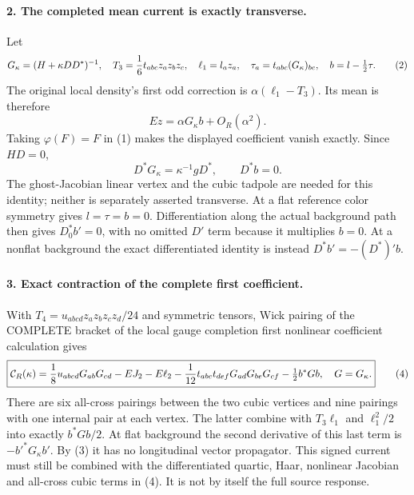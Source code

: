 \documentclass[11pt]{article}
\begin{document}
\paragraph{2. The completed mean current is exactly transverse.}
Let
\[
 G_\kappa=(H+\kappa DD^*)^{-1},\quad
 T_3={1\over6}t_{abc}z_a z_b z_c,\quad
 \ell_1=l_a z_a,\quad
 \tau_a=t_{abc}(G_\kappa)_{bc},\quad b=l-\tfrac12\tau.              \tag{2}
\]
The original local density's first odd correction is
$\alpha(\ell_1-T_3)$. Its mean is therefore
\[
 E z=\alpha G_\kappa b+O_R(\alpha^2).
\]
Taking $\varphi(F)=F$ in (1) makes the displayed coefficient vanish
exactly. Since $HD=0$,
\[
 D^*G_\kappa=\kappa^{-1}gD^*,\qquad
 \boxed{D^*b=0.}                                                  \tag{3}
\]
The ghost-Jacobian linear vertex and the cubic tadpole are needed for this
identity; neither is separately asserted transverse. At a flat reference
color symmetry gives $l=\tau=b=0$. Differentiation along the actual
background path then gives $D_0^*b'=0$, with no omitted $D'$ term because
it multiplies $b=0$. At a nonflat background the exact differentiated
identity is instead $D^*b'=-(D^*)'b$.

\paragraph{3. Exact contraction of the complete first coefficient.}
With $T_4=u_{abcd}z_a z_b z_c z_d/24$ and symmetric tensors, Wick pairing
of the COMPLETE bracket of the local gauge completion first nonlinear coefficient calculation gives
\[
 \boxed{\mathcal C_R(\kappa)=
 {1\over8}u_{abcd}G_{ab}G_{cd}-EJ_2-E\ell_2
 -{1\over12}t_{abc}t_{def}G_{ad}G_{be}G_{cf}
 -\tfrac12 b^*G b,\quad G=G_\kappa.}                              \tag{4}
\]
There are six all-cross pairings between the two cubic vertices and nine
pairings with one internal pair at each vertex. The latter combine with
$T_3\ell_1$ and $\ell_1^2/2$ into exactly $b^*Gb/2$.
At flat background the second derivative of this last term is
$-b'^*G_\kappa b'$. By (3) it has no longitudinal vector propagator.
This signed current must still be combined with the differentiated
quartic, Haar, nonlinear Jacobian and all-cross cubic terms in (4).
It is not by itself the full source response.
\end{document}
